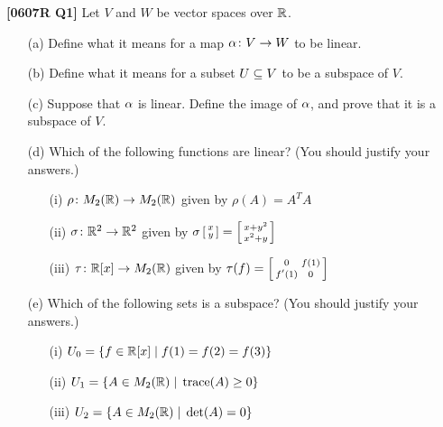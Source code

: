 \documentclass[a4paper]{article}
\begin{document}
\begin{problem}\textbf{[0607R Q1]}
 Let $V$ and $W$ be vector spaces over ${\mathbb{R}}$.
 \begin{itemize}
  \item[(a)] Define what it means for a map $\alpha\colon V\to W$ to be
   linear. 
  \item[(b)] Define what it means for a subset $U\subseteq V$ to be a
   subspace of $V$. 
  \item[(c)] Suppose that $\alpha$ is linear.  Define the image of
   $\alpha$, and prove that it is a subspace of $V$. 
  \item[(d)] Which of the following functions are linear?  (You should
   justify your answers.) 
   \begin{itemize}
    \item[(i)] $\rho\colon M_2({\mathbb{R}})\to M_2({\mathbb{R}})$ given by $\rho(A)=A^TA$
    \item[(ii)] $\sigma\colon{\mathbb{R}}^2\to{\mathbb{R}}^2$ given by 
     $\displaystyle \sigma\left[\begin{smallmatrix} x\\ y\end{smallmatrix}\right] =
      \left[\begin{smallmatrix} x+y^2 \\ x^2+y \end{smallmatrix}\right]$
    \item[(iii)] $\tau\colon{\mathbb{R}}[x]\to M_2({\mathbb{R}})$ given by 
     $\displaystyle \tau(f)= \left[\begin{smallmatrix} 0&f(1) \\ f'(1)&0\end{smallmatrix}\right]$
   \end{itemize}
  \item[(e)] Which of the following sets is a subspace?  (You should
   justify your answers.) 
   \begin{itemize}
    \item[(i)] $U_0=\{f\in{\mathbb{R}}[x]\;|\; f(1)=f(2)=f(3)\}$
    \item[(ii)] $U_1=\{A\in M_2({\mathbb{R}})\;|\;\operatorname{trace}(A)\geq 0\}$
    \item[(iii)] $U_2=\{A\in M_2({\mathbb{R}})\;|\;\det(A)=0\}$
   \end{itemize}
 \end{itemize}
\end{problem}
\end{document}
